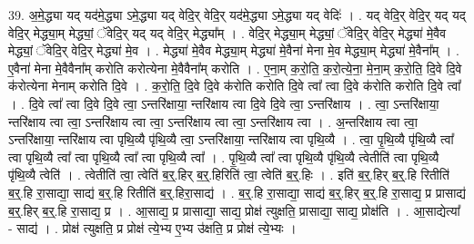 \documentclass[17pt]{extarticle}
\begin{document}
39. अ॒मे॒द्ध्या यद् यद॑मे॒द्ध्या ऽमे॒द्ध्या यद् वेदि॒र् वेदि॒र् यद॑मे॒द्ध्या ऽमे॒द्ध्या यद् वेदिः॑ । . यद् वेदि॒र् वेदि॒र् यद् यद् वेदि॒र् मेद्ध्या॒म् मेद्ध्यां॒ ॅवेदि॒र् यद् यद् वेदि॒र् मेद्ध्या᳚म् । . वेदि॒र् मेद्ध्या॒म् मेद्ध्यां॒ ॅवेदि॒र् वेदि॒र् मेद्ध्या॑ मे॒वैव मेद्ध्यां॒ ॅवेदि॒र् वेदि॒र् मेद्ध्या॑ मे॒व । . मेद्ध्या॑ मे॒वैव मेद्ध्या॒म् मेद्ध्या॑ मे॒वैना॑ मेना मे॒व मेद्ध्या॒म् मेद्ध्या॑ मे॒वैना᳚म् । . ए॒वैना॑ मेना मे॒वैवैना᳚म् करोति करोत्येना मे॒वैवैना᳚म् करोति । . ए॒ना॒म् क॒रो॒ति॒ क॒रो॒त्ये॒ना॒ मे॒ना॒म् क॒रो॒ति॒ दि॒वे दि॒वे क॑रोत्येना मेनाम् करोति दि॒वे । . क॒रो॒ति॒ दि॒वे दि॒वे क॑रोति करोति दि॒वे त्वा᳚ त्वा दि॒वे क॑रोति करोति दि॒वे त्वा᳚ । . दि॒वे त्वा᳚ त्वा दि॒वे दि॒वे त्वा॒ ऽन्तरि॑क्षाया॒ न्तरि॑क्षाय त्वा दि॒वे दि॒वे त्वा॒ ऽन्तरि॑क्षाय । . त्वा॒ ऽन्तरि॑क्षाया॒ न्तरि॑क्षाय त्वा त्वा॒ ऽन्तरि॑क्षाय त्वा त्वा॒ ऽन्तरि॑क्षाय त्वा त्वा॒ ऽन्तरि॑क्षाय त्वा । . अ॒न्तरि॑क्षाय त्वा त्वा॒ ऽन्तरि॑क्षाया॒ न्तरि॑क्षाय त्वा पृथि॒व्यै पृ॑थि॒व्यै त्वा॒ ऽन्तरि॑क्षाया॒ न्तरि॑क्षाय त्वा पृथि॒व्यै । . त्वा॒ पृ॒थि॒व्यै पृ॑थि॒व्यै त्वा᳚ त्वा पृथि॒व्यै त्वा᳚ त्वा पृथि॒व्यै त्वा᳚ त्वा पृथि॒व्यै त्वा᳚ । . पृ॒थि॒व्यै त्वा᳚ त्वा पृथि॒व्यै पृ॑थि॒व्यै त्वेतीति॑ त्वा पृथि॒व्यै पृ॑थि॒व्यै त्वेति॑ । . त्वेतीति॑ त्वा॒ त्वेति॑ ब॒र्॒.हिर् ब॒र्॒.हिरिति॑ त्वा॒ त्वेति॑ ब॒र्॒.हिः । . इति॑ ब॒र्॒.हिर् ब॒र्॒.हि रितीति॑ ब॒र्॒.हि रा॒साद्या॒ साद्य॑ ब॒र्॒.हि रितीति॑ ब॒र्॒.हिरा॒साद्य॑ । . ब॒र्॒.हि रा॒साद्या॒ साद्य॑ ब॒र्॒.हिर् ब॒र्॒.हि रा॒साद्य॒ प्र प्रासाद्य॑ ब॒र्॒.हिर् ब॒र्॒.हि रा॒साद्य॒ प्र । . आ॒साद्य॒ प्र प्रासाद्या॒ साद्य॒ प्रोक्ष॑ त्युक्षति॒ प्रासाद्या॒ साद्य॒ प्रोक्ष॑ति । . आ॒साद्येत्या᳚ - साद्य॑ । . प्रोक्ष॑ त्युक्षति॒ प्र प्रोक्ष॑ त्ये॒भ्य ए॒भ्य उ॑क्षति॒ प्र प्रोक्ष॑ त्ये॒भ्यः । \newline
\pagebreak
{}
\end{document}
